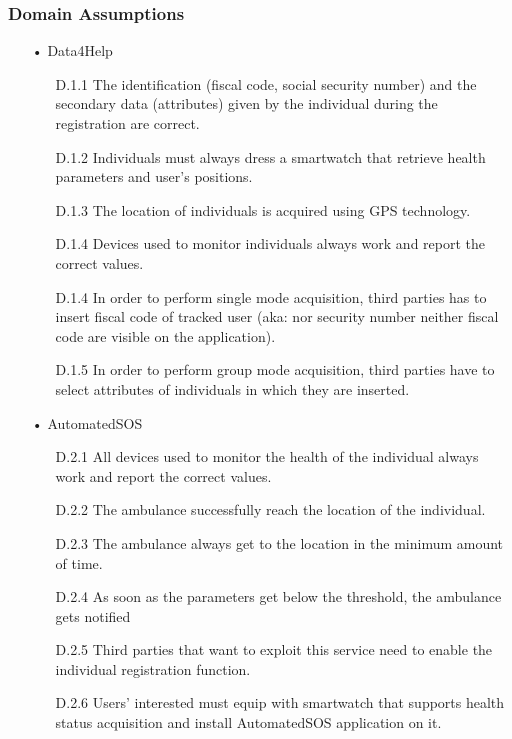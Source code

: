 \subsubsection{Domain Assumptions}
\begin{enumerate}

\item[•] {\Large Data4Help}
	\begin{enumerate}
	\item [D.1.1] The identification (fiscal code, social security number) and the secondary data (attributes) given by the individual during the registration are correct.
    \item [D.1.2] Individuals must always dress a smartwatch that retrieve health parameters and user's positions.
    
    \item [D.1.3] The location of individuals is acquired using GPS technology.
    \item [D.1.4] Devices used to monitor individuals always work and report the correct values.
	\item [D.1.4] In order to perform single mode acquisition, third parties has to insert fiscal code of tracked user (aka: nor security number neither fiscal code are visible on the application).
	\item [D.1.5] In order to perform group mode acquisition, third parties have to select attributes of individuals in which they are inserted.
	\end{enumerate}
	
\item[•] {\Large AutomatedSOS}
	\begin{enumerate}
	\item [D.2.1] All devices used to monitor the health of the individual always work and report the correct values.
    \item [D.2.2] The ambulance successfully reach the location of the individual.
    \item [D.2.3] The ambulance always get to the location in the minimum amount of time.
    \item [D.2.4] As soon as the parameters get below the threshold, the ambulance gets notified
    \item [D.2.5] Third parties that want to exploit this service need to enable the individual registration function.
    \item [D.2.6] Users' interested must equip with smartwatch that supports health status acquisition and install AutomatedSOS application on it.
	\end{enumerate}
	

\end{enumerate}
